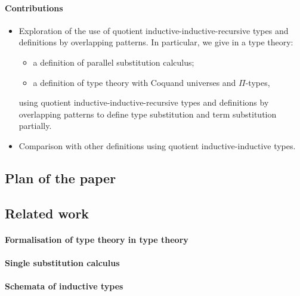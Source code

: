 \documentclass[a4paper,UKenglish,numberwithinsect,cleveref,thm-restate]{lipics-v2021}
\begin{document}
\paragraph*{Contributions}
\begin{itemize}
  \item Exploration of the use of quotient inductive-inductive-recursive types and definitions by overlapping patterns.
    In particular, we give in a type theory:
    \begin{itemize}
      \item a definition of parallel substitution calculus;
      \item a definition of type theory with Coquand universes and $\Pi$-types,
    \end{itemize}
   using quotient inductive-inductive-recursive types and definitions by overlapping patterns to define type substitution and term substitution partially.
  \item Comparison with other definitions using quotient inductive-inductive types.
\end{itemize}


\subsection{Plan of the paper}
\subsection{Related work}
\paragraph*{Formalisation of type theory in type theory}
\cite{Danielsson2006,Altenkirch2016a}
\cite{Altenkirch2017}

\paragraph*{Single substitution calculus}
\cite{Kaposi2023,Kaposi2024a}
\paragraph*{Schemata of inductive types}
\cite{Kaposi2019}
\end{document}
